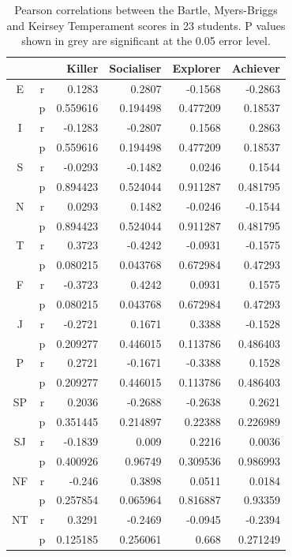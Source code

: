 \documentclass[12pt,a4paper,twoside]{report}
\begin{document}
\begin{table}
\begin{center}
\begin{tabular}{|c|c|r|r|r|r|}
	\hline  &  & Killer & Socialiser & Explorer & Achiever \\ 
	\hline E & r & 0.1283
	& 0.2807 & -0.1568 & -0.2863
	\\ 
	\hline  & p & 0.559616
	& 0.194498
	& 0.477209
	& 0.18537
	\\ 
	\hline I & r & -0.1283
	& -0.2807
	& 0.1568
	& 0.2863
	\\ 
	\hline  & p & 0.559616
	& 0.194498
	& 0.477209
	& 0.18537
	\\ 
	\hline S & r & -0.0293
	&  -0.1482
	& 0.0246
	& 0.1544
	\\ 
	\hline  & p & 0.894423
	& 0.524044
	& 0.911287
	& 0.481795
	\\ 
	\hline N & r & 0.0293
	&  0.1482
	& -0.0246
	& -0.1544
	\\ 
	\hline  & p & 0.894423
	& 0.524044
	& 0.911287
	& 0.481795
	\\ 
	\hline T & r & 0.3723
	& -0.4242
	& -0.0931
	& -0.1575
	\\ 
	\hline  & p & 0.080215
	& \cellcolor{gray!50} 0.043768
	& 0.672984
	& 0.47293
	\\ 
	\hline F & r & -0.3723
	& 0.4242
	& 0.0931
	& 0.1575
	\\ 
	\hline  & p & 0.080215
	& \cellcolor{gray!50} 0.043768
	& 0.672984
	& 0.47293
	\\ 
	\hline J & r & -0.2721
	& 0.1671
	& 0.3388
	& -0.1528
	\\ 
	\hline  & p & 0.209277
	& 0.446015
	& 0.113786
	& 0.486403
	\\ 
	\hline P & r & 0.2721
	& -0.1671
	& -0.3388
	& 0.1528
	\\ 
	\hline  & p & 0.209277
	& 0.446015
	& 0.113786
	& 0.486403
	\\ 
	\hline SP & r & 0.2036
	& -0.2688
	& -0.2638
	& 0.2621
	\\ 
	\hline  & p & 0.351445
	& 0.214897
	& 0.22388
	& 0.226989
	\\ 
	\hline SJ & r & -0.1839
	& 0.009
	& 0.2216
	& 0.0036
	\\ 
	\hline  & p & 0.400926
	& 0.96749
	& 0.309536
	& 0.986993
	\\ 
	\hline NF & r & -0.246
	& 0.3898
	& 0.0511
	& 0.0184
	\\ 
	\hline  & p & 0.257854
	& 0.065964
	& 0.816887
	& 0.93359
	\\ 
	\hline NT & r & 0.3291
	& -0.2469
	& -0.0945
	& -0.2394
	\\ 
	\hline  & p & 0.125185
	& 0.256061
	& 0.668
	& 0.271249
	\\ 
	\hline 
\end{tabular}
\caption{Pearson correlations between the Bartle, Myers-Briggs and Keirsey Temperament scores in 23 students. P values shown in grey are significant at the 0.05 error level.}
\label{results}
\end{center}
\end{table}
\end{document}
